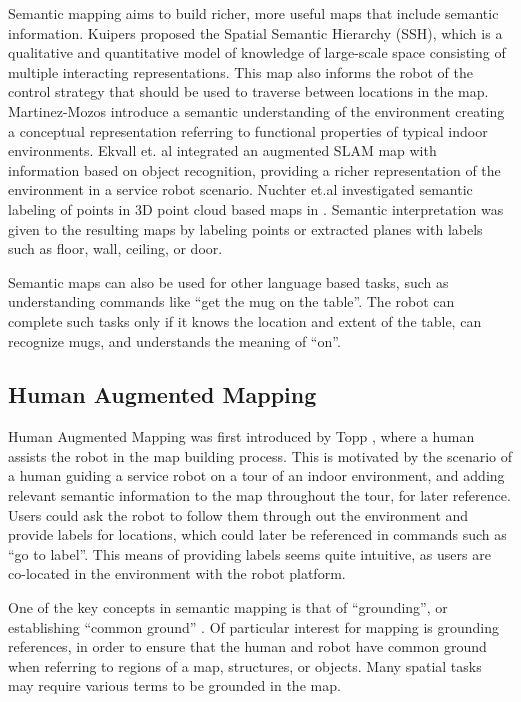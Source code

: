\documentclass[3p]{elsarticle}
\begin{document}
Semantic mapping aims to build richer, more useful maps that include semantic information. Kuipers \cite{kuipers2000spatial} proposed the Spatial Semantic Hierarchy (SSH), which is
a qualitative and quantitative model of knowledge of large-scale space consisting of
multiple interacting representations. This map also informs the robot of the control
strategy that should be used to traverse between locations in the map. Martinez-Mozos \cite{mozos2005supervised} introduce a semantic understanding of
the environment creating a conceptual representation referring to functional properties of typical indoor environments. Ekvall et. al \cite{ekvall2007object} integrated an augmented SLAM map with information based on
object recognition, providing a richer representation of the environment in a service
robot scenario. Nuchter et.al investigated semantic labeling of points in 3D point cloud based
maps in \cite{nuchter2008towards}. Semantic interpretation was given to the resulting maps 
by labeling points or extracted planes with labels such as floor, wall, ceiling, or door.

Semantic maps can also be used for other language based tasks, such as understanding commands like ``get the mug on the table''. The robot can complete such
tasks only if it knows the location and extent of the table, can recognize mugs, and understands the meaning of ``on''.

\subsection{Human Augmented Mapping}
\label{sec:rel_human_augmented_mapping}

Human Augmented Mapping was first introduced by Topp \cite{topp2006topological}, 
where a human assists the robot in the map building
process. This is motivated by the scenario of a human guiding a service robot on a
tour of an indoor environment, and adding relevant semantic information to the map
throughout the tour, for later reference. Users could ask the robot to follow them
through out the environment and provide labels for locations, which could later be
referenced in commands such as “go to label”. This means of providing labels seems
quite intuitive, as users are co-located in the environment with the robot platform.

One of the key concepts in semantic mapping is that of “grounding”, or establishing 
“common ground” \cite{clark1991grounding}. Of particular interest for mapping is grounding references,
in order to ensure that the human and robot have common ground when referring
to regions of a map, structures, or objects. Many spatial tasks may require various
terms to be grounded in the map.
\end{document}
